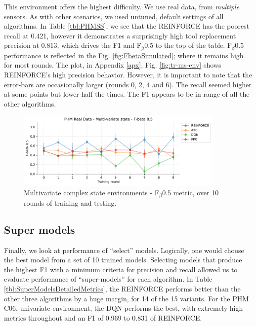 \documentclass[a4paper, 12pt]{article}
\begin{document}
This environment offers the highest difficulty. We use real data, from \textit{multiple} sensors. As with other scenarios, we used untuned, default settings of all algorithms. In Table \ref{tbl:PHMSS}, we see that the REINFORCE has the poorest recall at 0.421, however it demonstrates a surprisingly high tool replacement precision at 0.813, which drives the F1 and F$_\beta$0.5 to the top of the table. F$_\beta$0.5 performance is reflected in the Fig. \ref{fig:FbetaSimulated}; where it remains high for most rounds. The plot, in Appendix \ref{apx}, Fig. \ref{fig:tr-ms-env} shows REINFORCE's high precision behavior. However, it is important to note that the error-bars are occasionally larger (rounds 0, 2, 4 and 6). The recall seemed higher at some points but lower half the times. The F1 appears to be in range of all the other algorithms.
\begin{figure}[h]
	\centering
	\includegraphics[width=0.9\textwidth]{Multivariate_F05.pdf}  
	\caption{Multivariate complex state environments - F$_\beta$0.5 metric, over 10 rounds of training and testing.}
	\label{fig:FbetaPHMMS}
\end{figure}

\subsection{Super models}
Finally, we look at performance of ``select'' models. Logically, one would choose the best model from a set of 10 trained models. Selecting models that produce the highest F1 with a minimum criteria for precision and recall allowed us to evaluate performance of ``super-models'' for each algorithm. In Table \ref{tbl:SuperModelsDetailedMetrics}, the REINFORCE performs better than the other three algorithms by a huge margin, for 14 of the 15 variants. For the PHM C06, univariate environment, the DQN performs the best, with extremely high metrics throughout and an F1 of 0.969 to 0.831 of REINFORCE.
\end{document}
